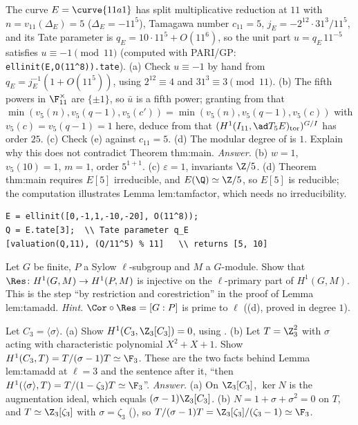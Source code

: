 \begin{exercise}[the curve \curve{11a1} at $q=11$, $\ell=5$]\label{ex:cohomology:11a1}
The curve $E=\curve{11a1}$ has split multiplicative reduction at $11$ with $n=v_{11}(\Delta_E)=5$ ($\Delta_E=-11^5$), Tamagawa number $c_{11}=5$, $j_E=-2^{12}\cdot31^3/11^5$, and its Tate parameter
is $q_E=10\cdot11^5+O(11^6)$, so the unit part $u=q_E\,11^{-5}$ satisfies $u\equiv-1\pmod{11}$ (computed with PARI/GP: \texttt{ellinit(E,O(11\^{}8)).tate}). (a) Check
$u\equiv-1$ by hand from $q_E=j_E^{-1}(1+O(11^5))$, using $2^{12}\equiv4$ and $31^3\equiv3\pmod{11}$. (b) The fifth powers in $\F_{11}^\times$ are $\{\pm1\}$, so $\bar u$ is a fifth power; granting
from  that $\min(v_5(n),v_5(q-1),v_5(c'))=\min(v_5(n),v_5(q-1),v_5(c))$ with $v_5(c)=v_5(q-1)=1$ here, deduce from  that
$(H^1(I_{11},\ad T_5E)_{\mathrm{tor}})^{G/I}$ has order $25$. (c) Check (e) against $c_{11}=5$. (d) The modular degree of  is $1$. Explain why this does not
contradict Theorem thm:main.
\emph{Answer.} (b) $w=1$, $v_5(10)=1$, $m=1$, order $5^{1+1}$. (c) $\varepsilon=1$, invariants $\Z/5$. (d) Theorem thm:main requires $E[5]$ irreducible, and $E(\Q)\simeq\Z/5$, so $E[5]$
is reducible; the computation illustrates Lemma lem:tamfactor, which needs no irreducibility.
\begin{lstlisting}[language=GP]
E = ellinit([0,-1,1,-10,-20], O(11^8));
Q = E.tate[3];  \\ Tate parameter q_E
[valuation(Q,11), (Q/11^5) % 11]   \\ returns [5, 10]
\end{lstlisting}
\end{exercise}

\begin{exercise}\label{ex:cohomology:sylow}
Let $G$ be finite, $P$ a Sylow $\ell$-subgroup and $M$ a $G$-module. Show that $\Res\colon H^1(G,M)\to H^1(P,M)$ is injective on the $\ell$-primary part of $H^1(G,M)$. This is the
step ``by restriction and corestriction'' in the proof of Lemma lem:tamadd.
\emph{Hint.} $\Cor\circ\Res=[G:P]$ is prime to $\ell$ ((d), proved in degree $1$).
\end{exercise}

\begin{exercise}\label{ex:cohomology:c3}
Let $C_3=\langle\sigma\rangle$. (a) Show $H^1(C_3,\Z_3[C_3])=0$, using . (b) Let $T=\Z_3^2$ with $\sigma$ acting with characteristic polynomial $X^2+X+1$. Show
$H^1(C_3,T)=T/(\sigma-1)T\simeq\F_3$. These are the two facts behind Lemma lem:tamadd at $\ell=3$ and the sentence after it, ``then
$H^1(\langle\sigma\rangle,T)=T/(1-\zeta_3)T\simeq\F_3$''.
\emph{Answer.} (a) On $\Z_3[C_3]$, $\ker N$ is the augmentation ideal, which equals $(\sigma-1)\Z_3[C_3]$. (b) $N=1+\sigma+\sigma^2=0$ on $T$, and $T\simeq\Z_3[\zeta_3]$ with $\sigma=\zeta_3$
(), so $T/(\sigma-1)T=\Z_3[\zeta_3]/(\zeta_3-1)\simeq\F_3$.
\end{exercise}

